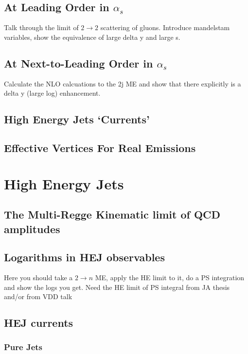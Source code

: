 	\subsection{At Leading Order in $\alpha_s$}
	\label{sub:HE22_LO}

	Talk through the limit of $2\rightarrow2$ scattering of gluons.  Introduce mandelstam variables, show the equivalence of large delta y and large s.

	\subsection{At Next-to-Leading Order in $\alpha_s$}
	\label{sub:HE22_NLO}

	Calculate the NLO calcuations to the 2j ME and show that there explicitly is a delta y (large log) enhancement.

	\subsection{High Energy Jets `Currents'}
	\label{sub:currents}

	\subsection{Effective Vertices For Real Emissions}
	\label{sub:effective_vertices_for_real_emissions}

\section{High Energy Jets}
\label{sec:section_name}

	\subsection{The Multi-Regge Kinematic limit of QCD amplitudes}
	\label{sub:subsection_name}

	\subsection{Logarithms in HEJ observables}
	\label{sub:subsection_name}

		Here you should take a $2\rightarrow n$ ME, apply the HE limit to it, do a PS integration and show the logs you get.  Need the HE limit of PS integral from JA thesis and/or from VDD talk

	\subsection{HEJ currents}
	\label{sub:subsection_name}

	\subsubsection{Pure Jets}
	\label{sub:subsection_name}

